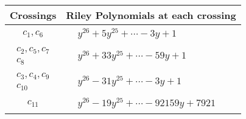 \documentclass[1p]{elsarticle_modified}
\theoremstyle{definition}
\begin{document}
\begin{tabular}{m{50pt}|m{274pt}}
Crossings & \hspace{64pt}Riley Polynomials at each crossing \\
\hline $$\begin{aligned}c_{1},c_{6}\end{aligned}$$&$\begin{aligned}
&y^{26}+5 y^{25}+\cdots-3 y+1
\end{aligned}$\\
\hline $$\begin{aligned}c_{2},c_{5},c_{7}\\c_{8}\end{aligned}$$&$\begin{aligned}
&y^{26}+33 y^{25}+\cdots-59 y+1
\end{aligned}$\\
\hline $$\begin{aligned}c_{3},c_{4},c_{9}\\c_{10}\end{aligned}$$&$\begin{aligned}
&y^{26}-31 y^{25}+\cdots-3 y+1
\end{aligned}$\\
\hline $$\begin{aligned}c_{11}\end{aligned}$$&$\begin{aligned}
&y^{26}-19 y^{25}+\cdots-92159 y+7921
\end{aligned}$\\
\hline
\end{tabular}
\vskip 2pc
\end{document}
